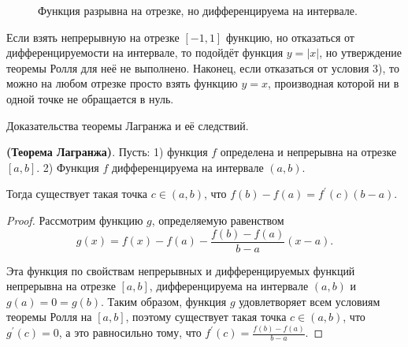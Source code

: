 \begin{figure}[h!]
    \caption{ Функция разрывна на отрезке, но дифференцируема на интервале.}
    \label{fig:image}
\end{figure}
Если взять непрерывную на отрезке $[-1,1]$ функцию, но отказаться от дифференцируемости на интервале, то подойдёт функция $y=|x|$, но утверждение теоремы Ролля для неё не выполнено. Наконец, если отказаться от условия 3), то можно на любом отрезке просто взять функцию $y=x$, производная которой ни в одной точке не обращается в нуль.
\newpage

\begin{problem}
Доказательства теоремы Лагранжа и её следствий.
\end{problem}
\begin{theorem} \textbf{(Теорема Лагранжа)}.
    Пусть:
    1) функция $f$ определена и непрерывна на отрезке $[a, b]$.
    2) Функция $f$ дифференцируема на интервале $(a, b)$.

    Тогда существует такая точка $c \in(a, b)$, что $f(b)-f(a)=f^{\prime}(c)(b-a)$.
\end{theorem}

\begin{proof}
    Рассмотрим функцию $g$, определяемую равенством
    $$
        g(x)=f(x)-f(a)-\frac{f(b)-f(a)}{b-a}(x-a) .
    $$

    Эта функция по свойствам непрерывных и дифференцируемых функций непрерывна на отрезке $[a, b]$, дифференцируема на интервале $(a, b)$ и $g(a)=0=g(b)$. Таким образом, функция $g$ удовлетворяет всем условиям теоремы Ролля на $[a, b]$, поэтому существует такая точка $c \in(a, b)$, что $g^{\prime}(c)=0$, а это равносильно тому, что $f^{\prime}(c)=\frac{f(b)-f(a)}{b-a}$.
\end{proof}


